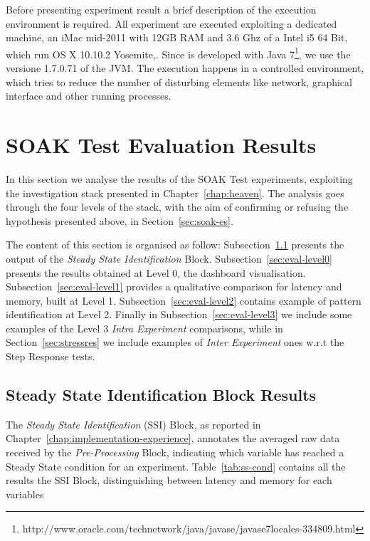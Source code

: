 Before presenting experiment result a brief description of the execution environment is required. All experiment are executed exploiting a dedicated machine, an iMac mid-2011 with 12GB RAM and 3.6 Ghz of a Intel i5 64 Bit, which run OS X 10.10.2 Yosemite,. Since \name is developed with Java 7\footnote{http://www.oracle.com/technetwork/java/javase/javase7locales-334809.html}, we use the versione 1.7.0.71 of the JVM.
The execution happens in a controlled environment, which tries to reduce the number of disturbing elements like network, graphical interface and other running processes.

\section{SOAK Test Evaluation Results}\label{sec:soakres}

In this section we analyse the results of the SOAK Test experiments, exploiting the investigation stack presented in Chapter~\ref{chap:heaven}. The analysis goes through the four levels of the stack, with the aim of confirming or refusing the hypothesis presented above, in Section~\ref{sec:soak-es}. 

The content of this section is organised as follow: 
Subsection~\ref{sec:eval-ssib} presents the output of the \textit{Steady State Identification} Block. 
Subsection~\ref{sec:eval-level0} presents the results obtained at Level 0, the dashboard visualisation.  
Subsection~\ref{sec:eval-level1} provides a qualitative comparison for latency and memory, built at Level 1. 
Subsection~\ref{sec:eval-level2} contains example of pattern identification at Level 2. 
Finally in Subsection~\ref{sec:eval-level3} we include some examples of the Level 3 \textit{Intra Experiment }comparisons, while in Section~\ref{sec:stressres} we include examples of \textit{Inter Experiment }ones w.r.t the Step Response tests.


\subsection{Steady State Identification Block Results}\label{sec:eval-ssib}

The \textit{Steady State Identification} (SSI) Block, as reported in Chapter~\ref{chap:implementation-experience}, annotates the averaged raw data received by the \textit{Pre-Processing} Block, indicating which variable has reached a Steady State condition for an experiment. Table~\ref{tab:ss-cond} contains all the results the SSI Block, distinguishing between latency and memory for each variables


